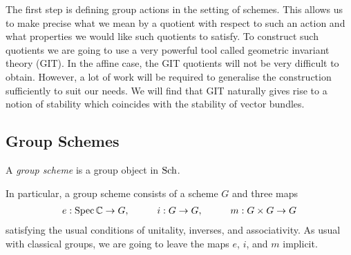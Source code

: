 \documentclass[12pt]{ociamthesis}  %
\begin{document}
The first step is defining group actions in the setting of schemes.
This allows us to make precise what we mean by a quotient with
respect to such an action and what properties we would like such
quotients to satisfy. To construct such quotients we are going to
use a very powerful tool called geometric invariant theory (GIT).
In the affine case, the GIT quotients will not be very difficult
to obtain. However, a lot of work will be required to generalise the
construction sufficiently to suit our needs. We will find that
GIT naturally gives rise to a notion of stability which coincides
with the stability of vector bundles.

\subsection{Group Schemes}

\begin{definition}
  A \emph{group scheme} is a group object in $\operatorname{Sch}$.
\end{definition}
In particular, a group scheme consists of a scheme $G$ and three maps
\begin{align}\label{eq:group_maps}
  e:\operatorname{Spec}\mathbb{C}\to G,\hspace{1cm}
  i:G\to G,\hspace{1cm}
  m:G\times G\to G
\end{align}
satisfying the usual conditions of unitality, inverses, and associativity.
As usual with classical groups, we are going to leave the maps
$e$, $i$, and $m$ implicit.
\end{document}
